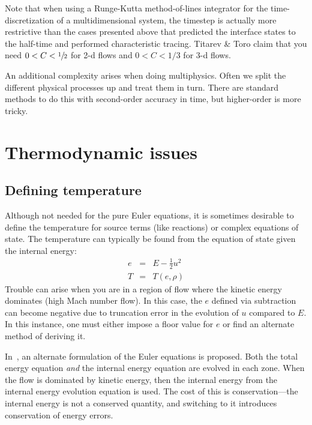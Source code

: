 Note that when using a Runge-Kutta method-of-lines integrator for the
time-discretization of a multidimensional system, the timestep is
actually more restrictive than the cases presented above that
predicted the interface states to the half-time and performed
characteristic tracing.  Titarev \& Toro \cite{titarevtoro} claim that
you need $0 < C < {\sfrac{1}{2}}$ for 2-d flows and $0 < C < 1/3$ for 3-d flows.

An additional complexity arises when doing multiphysics.  Often we
split the different physical processes up and treat them in turn.
There are standard methods to do this with second-order accuracy in time,
but higher-order is more tricky.





\section{Thermodynamic issues}

\subsection{Defining temperature}

  Although not needed for the pure
  Euler equations, it is sometimes desirable to define the temperature
  for source terms (like reactions) or complex equations of state.
  The temperature can typically be found from the equation of state
  given the internal energy:
  \begin{eqnarray}
  e &=& E - \frac{1}{2} u^2 \\
  T &=& T(e, \rho)
  \end{eqnarray}
  Trouble can arise when you are in a region of flow where the kinetic
  energy dominates (high Mach number flow).  In this case, the $e$ defined
  via subtraction can become negative due to truncation error in the
  evolution of $u$ compared to $E$.  In this instance, one must either
  impose a floor value for $e$ or find an alternate method of deriving
  it.

  In~\cite{bryan:1995}, an alternate formulation of the Euler equations
  is proposed.  Both the total energy equation {\em and} the internal
  energy equation are evolved in each zone.  When the flow is dominated
  by kinetic energy, then the internal energy from the internal energy
  evolution equation is used.  The cost of this is conservation---the
  internal energy is not a conserved quantity, and switching to it
  introduces conservation of energy errors.

